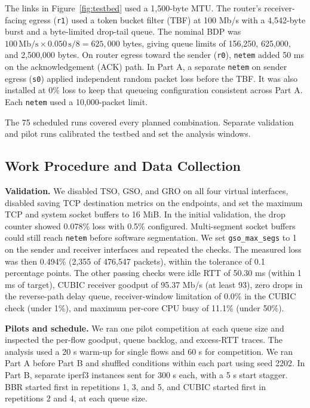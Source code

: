 \documentclass[11pt,a4paper]{article}
\begin{document}
The links in Figure~\ref{fig:testbed} used a 1,500-byte MTU. The router's receiver-facing egress (\texttt{r1}) used a token bucket filter (TBF) at 100 Mb/s with a 4,542-byte burst and a byte-limited drop-tail queue. The nominal BDP was $100\,\mathrm{Mb/s}\times 0.050\,\mathrm{s}/8=625{,}000$ bytes, giving queue limits of 156,250, 625,000, and 2,500,000 bytes. On router egress toward the sender (\texttt{r0}), \texttt{netem} added 50 ms on the acknowledgement (ACK) path. In Part A, a separate \texttt{netem} on sender egress (\texttt{s0}) applied independent random packet loss before the TBF. It was also installed at 0\% loss to keep that queueing configuration consistent across Part A. Each \texttt{netem} used a 10,000-packet limit.

The 75 scheduled runs covered every planned combination. Separate validation and pilot runs calibrated the testbed and set the analysis windows.

\subsection{Work Procedure and Data Collection}

\textbf{Validation.} We disabled TSO, GSO, and GRO on all four virtual interfaces, disabled saving TCP destination metrics on the endpoints, and set the maximum TCP and system socket buffers to 16 MiB. In the initial validation, the drop counter showed 0.078\% loss with 0.5\% configured. Multi-segment socket buffers could still reach \texttt{netem} before software segmentation. We set \texttt{gso\_max\_segs} to 1 on the sender and receiver interfaces and repeated the checks. The measured loss was then 0.494\% (2,355 of 476,547 packets), within the tolerance of 0.1 percentage points. The other passing checks were idle RTT of 50.30 ms (within 1 ms of target), CUBIC receiver goodput of 95.37 Mb/s (at least 93), zero drops in the reverse-path delay queue, receiver-window limitation of 0.0\% in the CUBIC check (under 1\%), and maximum per-core CPU busy of 11.1\% (under 50\%).

\textbf{Pilots and schedule.} We ran one pilot competition at each queue size and inspected the per-flow goodput, queue backlog, and excess-RTT traces. The analysis used a 20 s warm-up for single flows and 60 s for competition. We ran Part A before Part B and shuffled conditions within each part using seed 2202. In Part B, separate iperf3 instances sent for 300 s each, with a 5 s start stagger. BBR started first in repetitions 1, 3, and 5, and CUBIC started first in repetitions 2 and 4, at each queue size.
\end{document}
